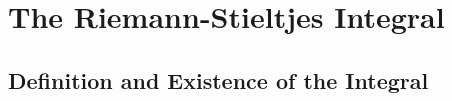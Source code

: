 
\chapter{The Riemann-Stieltjes Integral}
\label{chap:rudin6}


\section{Definition and Existence of the Integral}
\label{sec:chap6:def_existence_rs_integral}

